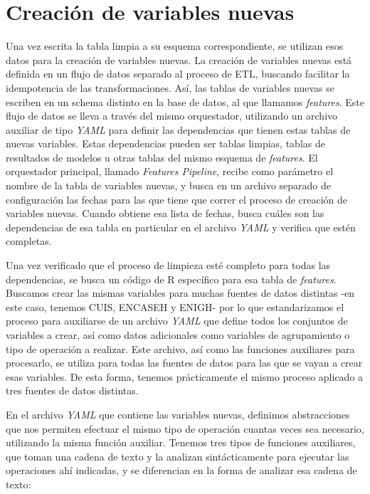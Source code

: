 \section*{Creación de variables nuevas}
Una vez escrita la tabla limpia a su esquema correspondiente, se utilizan esos datos para la creación de variables nuevas. La creación de variables nuevas está definida en un flujo de datos separado al proceso de ETL, buscando facilitar la idempotencia de las transformaciones. Así, las tablas de variables nuevas se escriben en un schema distinto en la base de datos, al que llamamos \textit{features}. Este flujo de datos se lleva a través del mismo orquestador, utilizando un archivo auxiliar de tipo \textit{YAML} para definir las dependencias que tienen estas tablas de nuevas variables. Estas dependencias pueden ser tablas limpias, tablas de resultados de modelos u otras tablas del mismo esquema de \textit{features}. El orquestador principal, llamado \textit{Features Pipeline}, recibe como parámetro el nombre de la tabla de variables nuevas, y busca en un archivo separado de configuración las fechas para las que tiene que correr el proceso de creación de variables nuevas. Cuando obtiene esa lista de fechas, busca cuáles son las dependencias de esa tabla en particular en el archivo \textit{YAML} y verifica que estén completas.
\par
\noindent
Una vez verificado que el proceso de limpieza esté completo para todas las dependencias, se busca un código de R específico para esa tabla de \textit{features}. Buscamos crear las mismas variables para muchas fuentes de datos distintas -en este caso, tenemos CUIS, ENCASEH y ENIGH- por lo que estandarizamos el proceso para auxiliarse de un archivo \textit{YAML} que define todos los conjuntos de variables a crear, así como datos adicionales como variables de agrupamiento o tipo de operación a realizar. Este archivo, así como las funciones auxiliares para procesarlo, se utiliza para todas las fuentes de datos para las que se vayan a crear esas variables. De esta forma, tenemos prácticamente el mismo proceso aplicado a tres fuentes de datos distintas.
\par
\noindent
En el archivo \textit{YAML} que contiene las variables nuevas, definimos abstracciones que nos permiten efectuar el mismo tipo de operación cuantas veces sea necesario, utilizando la misma función auxiliar. Tenemos tres tipos de funciones auxiliares, que toman una cadena de texto y la analizan sintácticamente para ejecutar las operaciones ahí indicadas, y se diferencian en la forma de analizar esa cadena de texto:

